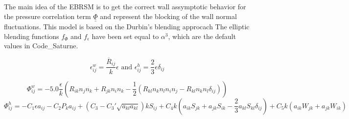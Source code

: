 \documentclass[11pt,letterpaper,english]{article}
\begin{document}
The main idea of the EBRSM is to get the correct wall assymptotic behavior for the pressure correlation term $\underline{\underline{\Phi}}$ and represent the blocking of the wall normal fluctuations. This model is based on the Durbin's blending approcach
The elliptic blending functions $f_{\Phi}$ and $f_{\epsilon}$ have been set equal to $\alpha^{3}$, which are the default values in Code\_Saturne.



\begin{equation}
  \epsilon_{ij}^{w} = \frac{\overline{R}_{ij}}{k}\epsilon \text{ and } \epsilon_{ij}^{h} =\frac{2}{3} \epsilon \delta_{ij}
\end{equation}

\begin{equation}
  \Phi_{ij}^{w} = -5.0 \frac{\epsilon}{k} (R_{ik}n_{j}n_{k} + R_{jk} n_{i} n_{k} - \frac{1}{2} (R_{kl}n_{k}n_{l}n_{i}n_{j}-R_{kl}n_{k}n_{l}\delta_{ij})) 
\end{equation}
\begin{equation}
  \Phi_{ij}^{h} = -C_{1}\epsilon a_{ij} -C_{2}P_{k}a_{ij} + (C_{3} - C_{3}'\sqrt{a_{kl}a_{kl}})k S_{ij} + C_{4}k(a_{ik}S_{jk} + a_{jk}S_{ik} - \frac{2}{3} a_{kl} S_{kl} \delta_{ij}) + C_{5}k(a_{ik}W_{jk} + a_{jk}W_{ik})%
\end{equation}
\end{document}
